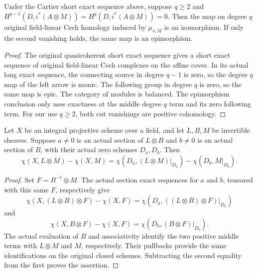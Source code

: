 \begin{lemma}
\label{lem:seshadri-one-cut-cohomology-iso}
\leanok
Under the Cartier short exact sequence above, suppose $q\geq2$ and
$H^{q-1}(D,i^*(A\otimes M))=H^q(D,i^*(A\otimes M))=0$.
Then the map on degree $q$ original field-linear Cech homology induced
by $\mu_{s,M}$ is an isomorphism.
If only the second vanishing holds, the same map is an epimorphism.
\end{lemma}
\begin{proof}
The original quasicoherent short exact sequence gives a short exact
sequence of original field-linear Cech complexes on the affine cover.
In its actual long exact sequence, the connecting source in degree
$q-1$ is zero, so the degree $q$ map of the left arrow is monic.
The following group in degree $q$ is zero, so the same map is epic.
The category of modules is balanced. The epimorphism conclusion only
uses exactness at the middle degree $q$ term and its zero following term.
For our use $q\geq2$, both cut vanishings are positive cohomology.
\end{proof}

\begin{lemma}
\label{lem:seshadri-two-cut-euler-difference}
\leanok
Let $X$ be an integral projective scheme over a field, and let $L,B,M$
be invertible sheaves. Suppose $a\ne0$ is an actual section of $L\otimes B$
and $b\ne0$ is an actual section of $B$, with their actual zero schemes
$D_a,D_b$. Then
\[
 \chi(X,L\otimes M)-\chi(X,M)
 =\chi(D_a,(L\otimes M)|_{D_a})-\chi(D_b,M|_{D_b}).
\]
\end{lemma}
\begin{proof}
Set $F=B^{-1}\otimes M$. The actual section exact sequences for $a$
and $b$, tensored with this same $F$, respectively give
\[
 \chi(X,(L\otimes B)\otimes F)-\chi(X,F)
 =\chi(D_a,((L\otimes B)\otimes F)|_{D_a})
\]
and
\[
 \chi(X,B\otimes F)-\chi(X,F)
 =\chi(D_b,(B\otimes F)|_{D_b}).
\]
The actual evaluation of $B$ and associativity identify the two positive
middle terms with $L\otimes M$ and $M$, respectively. Their pullbacks
provide the same identifications on the original closed schemes.
Subtracting the second equality from the first proves the assertion.
\end{proof}

